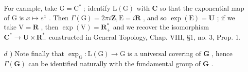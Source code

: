For example, take \(\mathrm{G} = \mathrm{C}^*\) ; identify \(\mathrm{L(G)}\) with \(\mathbf{C}\) so that the exponential map of \(\mathrm{G}\) is \(x \mapsto e^x\) . Then \(\Gamma(\mathrm{G}) = 2\pi i\mathbf{Z}, \mathrm{E} = i\mathbf{R}\) , and so \(\exp(\mathrm{E}) = \mathbf{U}\) ; if we take \(\mathrm{V} = \mathbf{R}\) , then \(\exp(\mathrm{V}) = \mathbf{R}_+^*\) and we recover the isomorphism \(\mathbf{C}^* \to \mathbf{U} \times \mathbf{R}_+^*\) constructed in General Topology, Chap. VIII, §1, no. 3, Prop. 1.

\(d\) ) Note finally that \(\exp_{\mathrm{G}}:\mathrm{L}(\mathrm{G})\to \mathrm{G}\) is a universal covering of \(\mathbf{G}\) , hence \(\Gamma (\mathbf{G})\) can be identified naturally with the fundamental group of \(\mathbf{G}\) .

